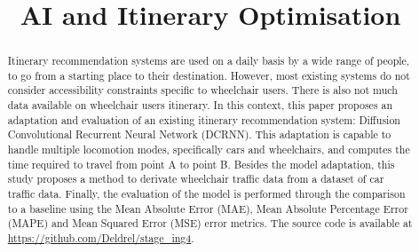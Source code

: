 \documentclass[conference]{IEEEtran}
\begin{document}



    \title{AI and Itinerary Optimisation}
    \author{
        \and
        \and
    }

    \maketitle

    \begin{abstract}
        Itinerary recommendation systems are used on a daily basis by a wide range of people, to go from a starting place to their destination.
        However, most existing systems do not consider accessibility constraints specific to wheelchair users.
        There is also not much data available on wheelchair users itinerary.
        In this context, this paper proposes an adaptation and evaluation of an existing itinerary recommendation system: Diffusion Convolutional Recurrent Neural Network (DCRNN).
        This adaptation is capable to handle multiple locomotion modes, specifically cars and wheelchairs, and computes the time required to travel from point A to point B.
        Besides the model adaptation, this study proposes a method to derivate wheelchair traffic data from a dataset of car traffic data.
        Finally, the evaluation of the model is performed through the comparison to a baseline using the Mean Absolute Error (MAE), Mean Absolute Percentage Error (MAPE) and Mean Squared Error (MSE) error metrics.
        The source code is available at \url{https://github.com/Deldrel/stage_ing4}.
    \end{abstract}
\end{document}
